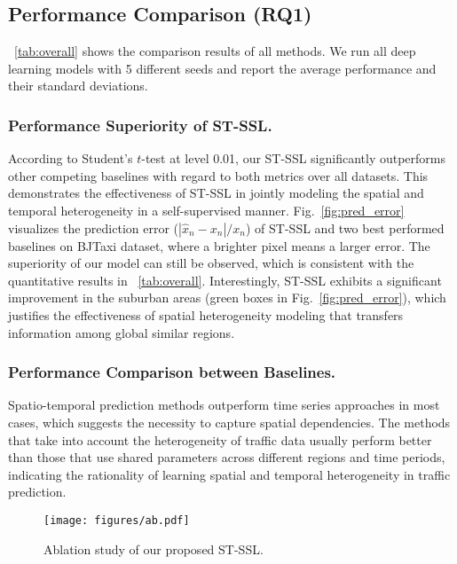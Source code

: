 \documentclass[letterpaper]{article} \usepackage{aaai23}  \usepackage{times}  \usepackage{helvet}  \usepackage{courier}  \usepackage[hyphens]{url}  \usepackage{graphicx} \urlstyle{rm} \def\UrlFont{\rm}  \usepackage{natbib}  \usepackage{caption} \frenchspacing  \setlength{\pdfpagewidth}{8.5in} \setlength{\pdfpageheight}{11in}
\newcommand{\name}{ST-SSL\xspace}
\newcommand{\figureautorefname}{Fig.}
\begin{document}
\subsection{Performance Comparison (RQ1)}

\tablename{~\ref{tab:overall}} shows the comparison results of all methods. We run all deep learning models with 5 different seeds and report the average performance and their standard deviations. 

\subsubsection{Performance Superiority of \name.} According to Student's $t$-test at level 0.01, our \name significantly outperforms other competing baselines with regard to both metrics over all datasets. This demonstrates the effectiveness of \name in jointly modeling the spatial and temporal heterogeneity in a self-supervised manner. \figureautorefname{~\ref{fig:pred_error}} visualizes the prediction error ($|\hat{x}_n - x_n| / x_n$) of \name and two best performed baselines on BJTaxi dataset, where a brighter pixel means a larger error. The superiority of our model can still be observed, which is consistent with the quantitative results in \tablename{~\ref{tab:overall}}. Interestingly, \name exhibits a significant improvement in the suburban areas (green boxes in \figureautorefname{~\ref{fig:pred_error}}), which justifies the effectiveness of spatial heterogeneity modeling that transfers information among global similar regions. 


\subsubsection{Performance Comparison between Baselines.} Spatio-temporal prediction methods outperform time series approaches in most cases, which suggests the necessity to capture spatial dependencies. The methods that take into account the heterogeneity of traffic data usually perform better than those that use shared parameters across different regions and time periods, indicating the rationality of learning spatial and temporal heterogeneity in traffic prediction.


\begin{figure}[t]
    \centering
    \texttt{[image: figures/ab.pdf]}
\caption{Ablation study of our proposed \name.}
    \vspace{-.3cm}
    \label{fig:ab}
\end{figure}
\end{document}
